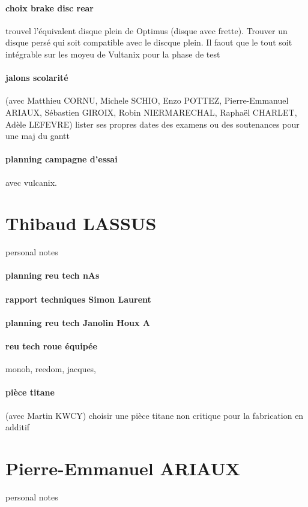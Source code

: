 \paragraph{choix brake disc rear} trouvel l'équivalent disque plein de Optimus (disque avec frette). Trouver un disque persé qui soit compatible avec le discque plein. Il faout que le tout soit intégrable sur les moyeu de Vultanix pour la phase de test
\paragraph{jalons scolarité} (avec Matthieu CORNU, Michele SCHIO, Enzo POTTEZ, Pierre-Emmanuel ARIAUX, Sébastien GIROIX, Robin NIERMARECHAL, Raphaël CHARLET, Adèle LEFEVRE) lister ses propres dates des examens ou des soutenances pour une maj du gantt
\paragraph{planning campagne d'essai} avec vulcanix.

 
 \newpage \section*{Thibaud LASSUS} 
 \par personal notes
\paragraph{planning reu tech nAs} 
\paragraph{rapport techniques Simon Laurent} 
\paragraph{planning reu tech Janolin Houx A} 
\paragraph{reu tech roue équipée} monoh, reedom, jacques, 
\paragraph{pièce titane} (avec Martin KWCY) choisir une pièce titane non critique pour la fabrication en additif

 
 \newpage \section*{Pierre-Emmanuel ARIAUX} 
 \par personal notes
